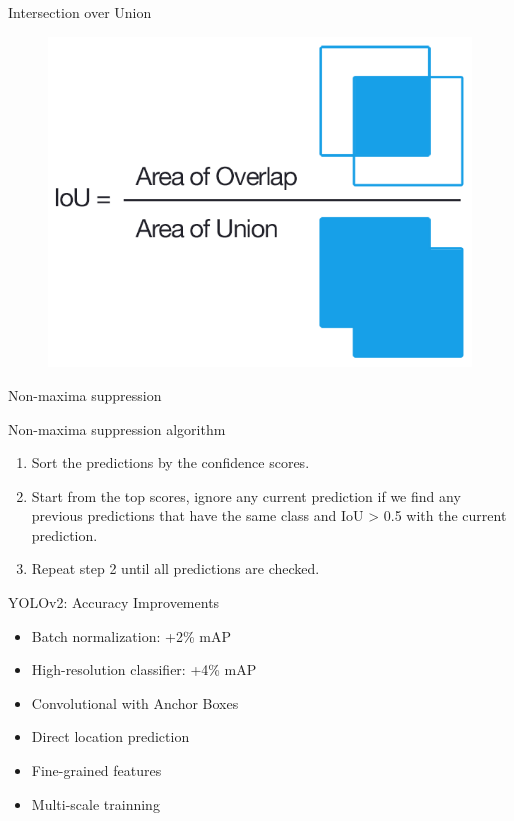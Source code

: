 \documentclass[aspectratio=169]{beamer}
\begin{document}
\begin{frame}{Intersection over Union}
\begin{figure}
    \centering
    \includegraphics[scale=.35]{demo/figs/iou.png}
\end{figure}
\end{frame}

\begin{frame}{Non-maxima suppression}
\begin{alertblock}{Non-maxima suppression algorithm}
\begin{enumerate}
    \item Sort the predictions by the confidence scores.
    \item Start from the top scores, ignore any current prediction if we find any previous predictions that have the same class and IoU > 0.5 with the current prediction.
    \item Repeat step 2 until all predictions are checked.
\end{enumerate}
\end{alertblock}
\end{frame}

\begin{frame}{YOLOv2: Accuracy Improvements}
\begin{itemize}
    \item Batch normalization: +2\% mAP
    \item High-resolution classifier: +4\% mAP
    \item Convolutional with Anchor Boxes
    \item Direct location prediction
    \item Fine-grained features
    \item Multi-scale trainning
\end{itemize}
\end{frame}
\end{document}
